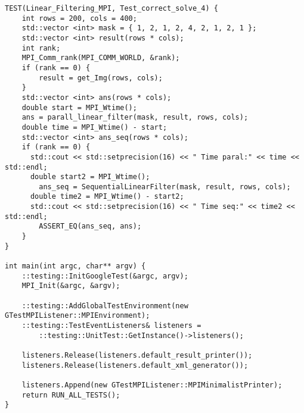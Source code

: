 \documentclass{report}
\begin{document}
\begin{lstlisting}
TEST(Linear_Filtering_MPI, Test_correct_solve_4) {
    int rows = 200, cols = 400;
    std::vector <int> mask = { 1, 2, 1, 2, 4, 2, 1, 2, 1 };
    std::vector <int> result(rows * cols);
    int rank;
    MPI_Comm_rank(MPI_COMM_WORLD, &rank);
    if (rank == 0) {
        result = get_Img(rows, cols);
    }
    std::vector <int> ans(rows * cols);
    double start = MPI_Wtime();
    ans = parall_linear_filter(mask, result, rows, cols);
    double time = MPI_Wtime() - start;
    std::vector <int> ans_seq(rows * cols);
    if (rank == 0) {
      std::cout << std::setprecision(16) << " Time paral:" << time << std::endl;
      double start2 = MPI_Wtime();
        ans_seq = SequentialLinearFilter(mask, result, rows, cols);
      double time2 = MPI_Wtime() - start2;
      std::cout << std::setprecision(16) << " Time seq:" << time2 << std::endl;
        ASSERT_EQ(ans_seq, ans);
    }
}

int main(int argc, char** argv) {
    ::testing::InitGoogleTest(&argc, argv);
    MPI_Init(&argc, &argv);

    ::testing::AddGlobalTestEnvironment(new GTestMPIListener::MPIEnvironment);
    ::testing::TestEventListeners& listeners =
        ::testing::UnitTest::GetInstance()->listeners();

    listeners.Release(listeners.default_result_printer());
    listeners.Release(listeners.default_xml_generator());

    listeners.Append(new GTestMPIListener::MPIMinimalistPrinter);
    return RUN_ALL_TESTS();
}

\end{lstlisting}
    
\end{document}
